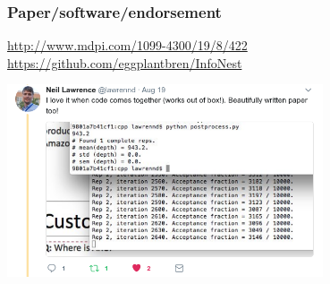 \documentclass{beamer}
\begin{document}
\begin{frame}
\frametitle{Paper/software/endorsement}

{\color{blue}\url{http://www.mdpi.com/1099-4300/19/8/422}
\url{https://github.com/eggplantbren/InfoNest}}
\vspace{0.5cm}

\begin{center}
\includegraphics[width=0.7\textwidth]{lawrence.png}
\end{center}

\end{frame}














\end{document}
